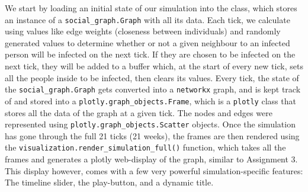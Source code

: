 \documentclass[fontsize=11pt]{article}
\newcommand{\ttt}[1]{\texttt{#1}}
\begin{document}
We start by loading an initial state of our simulation into the class, which stores an instance of a \ttt{social\_graph.Graph} with all its data. Each tick, we calculate using values like edge weights (closeness between individuals) and randomly generated values to determine whether or not a given neighbour to an infected person will be infected on the next tick. If they are chosen to be infected on the next tick, they will be added to a buffer which, at the start of every new tick, sets all the people inside to be infected, then clears its values. Every tick, the state of the \ttt{social\_graph.Graph} gets converted into a \ttt{networkx} graph, and is kept track of and stored into a \ttt{plotly.graph\_objects.Frame}, which is a \ttt{plotly} class that stores all the data of the graph at a given tick. The nodes and edges were represented using \ttt{plotly.graph\_objects.Scatter} objects. Once the simulation has gone through the full 21 ticks (21 weeks), the frames are then rendered using the \ttt{visualization.render\_simulation\_full()} function, which takes all the frames and generates a plotly web-display of the graph, similar to Assignment 3. This display however, comes with a few very powerful simulation-specific features: The timeline slider, the play-button, and a dynamic title.
\newpage
\end{document}
